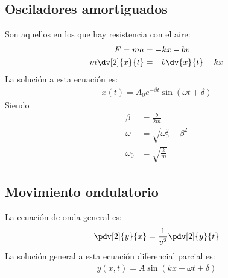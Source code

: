\documentclass{article}
\begin{document}
    \subsection{Osciladores amortiguados}
    Son aquellos en los que hay resistencia con el aire:
    \begin{equation}
        \begin{split}
            F = ma &= -kx -bv\\
            m\dv[2]{x}{t} &= -b\dv{x}{t} -kx
        \end{split}
    \end{equation}
    La solución a esta ecuación es:
    \begin{equation}
        \begin{split}
            x(t)= A_{0} e^{-\beta t}\sin (\omega t + \delta )
        \end{split}
    \end{equation}
    Siendo
    \begin{equation}
        \begin{split}
            \beta &= \frac{b}{2m}\\
            \omega &= \sqrt{\omega_{0}^{2}-\beta^{2}}\\
            \omega _{0} &= \sqrt{\frac{k}{m}}
        \end{split}
    \end{equation}
    \subsection{Movimiento ondulatorio}
    La ecuación de onda general es:
    \begin{equation}
        \begin{split}
            \pdv[2]{y}{x} = \frac{1}{v^{2}} \pdv[2]{y}{t}
        \end{split}
    \end{equation}
    La solución general a esta ecuación diferencial parcial es:
    \begin{equation}
        \begin{split}
            y(x,t) = A\sin (kx -\omega t +\delta )
        \end{split}
    \end{equation}
\end{document}
